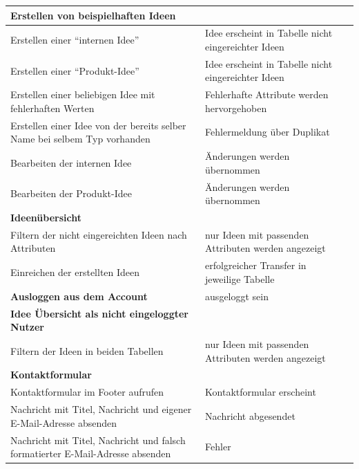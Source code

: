 \begin{center}
\begin{longtable}{|p{}|p{}|p{}|}
        \textbf{Erstellen von beispielhaften Ideen} & &\\
        \hline
        Erstellen einer \enquote{internen Idee} & Idee erscheint in Tabelle nicht eingereichter Ideen &\\
        \hline
        Erstellen einer \enquote{Produkt-Idee} & Idee erscheint in Tabelle nicht eingereichter Ideen &\\
        \hline
        Erstellen einer beliebigen Idee mit fehlerhaften Werten & Fehlerhafte Attribute werden hervorgehoben &\\
        \hline
        Erstellen einer Idee von der bereits selber Name bei selbem Typ vorhanden & Fehlermeldung über Duplikat &\\
        \hline
        Bearbeiten der internen Idee & Änderungen werden übernommen &\\
        \hline
        Bearbeiten der Produkt-Idee & Änderungen werden übernommen &\\
        \hline
        \hline

        \textbf{Ideenübersicht} & &\\
        \hline
        Filtern der nicht eingereichten Ideen nach Attributen & nur Ideen mit passenden Attributen werden angezeigt &\\
        \hline
        Einreichen der erstellten Ideen & erfolgreicher Transfer in jeweilige Tabelle &\\
        \hline
        \hline

        \textbf{Ausloggen aus dem Account} & ausgeloggt sein &\\
        \hline
        \hline

        \textbf{Idee Übersicht als nicht eingeloggter Nutzer} & &\\
        \hline
        Filtern der Ideen in beiden Tabellen & nur Ideen mit passenden Attributen werden angezeigt &\\
        \hline
        \hline

        \textbf{Kontaktformular} & & \\
        \hline
        Kontaktformular im Footer aufrufen & Kontaktformular erscheint & \\
        \hline
        Nachricht mit Titel, Nachricht und eigener E-Mail-Adresse absenden & Nachricht abgesendet & \\
        \hline
        Nachricht mit Titel, Nachricht und falsch formatierter E-Mail-Adresse absenden & Fehler & \\
        \hline
        \hline


\end{longtable}
\end{center}
